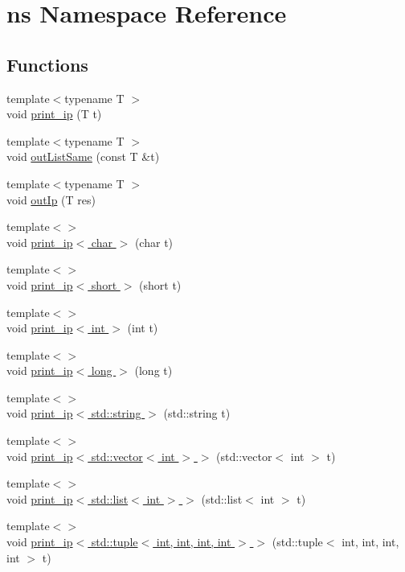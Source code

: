 \hypertarget{namespacens}{\section{ns Namespace Reference}
\label{namespacens}
}
\subsection*{Functions}
\begin{DoxyCompactItemize}
\item 
{\footnotesize template$<$typename T $>$ }\\void \hyperlink{namespacens_a0ed39a45b7d27e50043645c276c5ac7b}{print\-\_\-ip} (T t)
\item 
{\footnotesize template$<$typename T $>$ }\\void \hyperlink{namespacens_aac25dfd46e28f6f98385b4b4fa132e2c}{out\-List\-Same} (const T \&t)
\item 
{\footnotesize template$<$typename T $>$ }\\void \hyperlink{namespacens_acdb5ae18e1c5603d4d37642937f4e82f}{out\-Ip} (T res)
\item 
{\footnotesize template$<$$>$ }\\void \hyperlink{namespacens_a089fe6c314abd50c8b8537137d664073}{print\-\_\-ip$<$ char $>$} (char t)
\item 
{\footnotesize template$<$$>$ }\\void \hyperlink{namespacens_a2959eaed0257c7fa64e13c54e194923f}{print\-\_\-ip$<$ short $>$} (short t)
\item 
{\footnotesize template$<$$>$ }\\void \hyperlink{namespacens_a40d22b916e1fabc9e6c47345080442e7}{print\-\_\-ip$<$ int $>$} (int t)
\item 
{\footnotesize template$<$$>$ }\\void \hyperlink{namespacens_a689984f15cea5d829a21387cefb52ed6}{print\-\_\-ip$<$ long $>$} (long t)
\item 
{\footnotesize template$<$$>$ }\\void \hyperlink{namespacens_a63ad91c5c1fc95cb63f8eb7cd9ea6169}{print\-\_\-ip$<$ std\-::string $>$} (std\-::string t)
\item 
{\footnotesize template$<$$>$ }\\void \hyperlink{namespacens_a2d9ac170330617fd31f5567b491f760d}{print\-\_\-ip$<$ std\-::vector$<$ int $>$ $>$} (std\-::vector$<$ int $>$ t)
\item 
{\footnotesize template$<$$>$ }\\void \hyperlink{namespacens_aa11eb79003b32a390227b91614e599f4}{print\-\_\-ip$<$ std\-::list$<$ int $>$ $>$} (std\-::list$<$ int $>$ t)
\item 
{\footnotesize template$<$$>$ }\\void \hyperlink{namespacens_acda3d276a9e55fe4dd9043d8d0d539e6}{print\-\_\-ip$<$ std\-::tuple$<$ int, int, int, int $>$ $>$} (std\-::tuple$<$ int, int, int, int $>$ t)
\end{DoxyCompactItemize}


